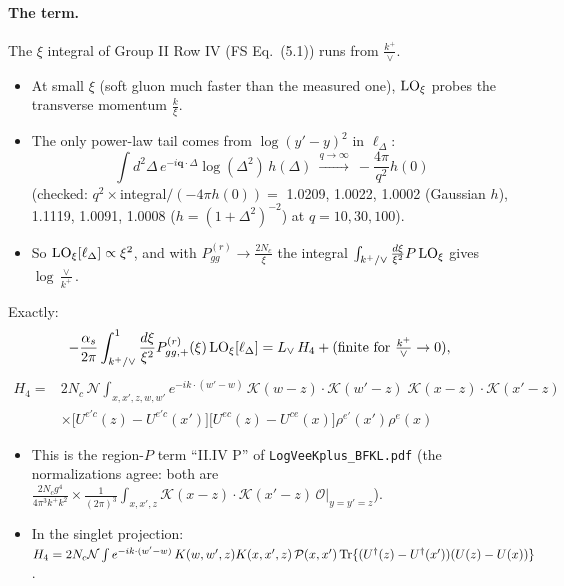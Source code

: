 \documentclass[10pt]{article}
\numberwithin{equation}{section}
\newcommand{\Lv}{L_{\vee}}
\newcommand{\KK}{\mathcal K}
\newcommand{\OO}{\mathcal O}
\newcommand{\NN}{\mathcal N}
\newcommand{\pre}{\frac{1}{(2\pi)^3}}
\newcommand{\phw}{e^{-ik\cdot(w'-w)}}
\begin{document}
\paragraph{The term.} The $\xi$ integral of Group II Row IV (FS Eq.~(5.1)) runs from $\frac{k^+}{\vee}$.
\begin{itemize}
\item At small $\xi$ (soft gluon much faster than the measured one), ${\rm LO}_\xi$ probes the transverse momentum $\frac{k}{\xi}$.
\item The only power-law tail comes from $\log(y'-y)^2$ in $\ell_\Delta$:
\begin{equation}
\int d^2\Delta\,e^{-i\mathbf q\cdot\Delta}\log(\Delta^2)\,h(\Delta)\ \xrightarrow{q\to\infty}\ -\frac{4\pi}{q^2}h(0)
\end{equation}
(checked: $q^2\times$integral$/(-4\pi h(0))=$ 1.0209, 1.0022, 1.0002 (Gaussian $h$), 1.1119, 1.0091, 1.0008 ($h=(1+\Delta^2)^{-2}$) at $q=10,30,100$).
\item So ${\rm LO}_\xi[\ell_\Delta]\propto\xi^2$, and with $P^{(r)}_{gg}\to\frac{2N_c}{\xi}$ the integral $\int_{k^+/\vee}\frac{d\xi}{\xi^2}P\,{\rm LO}_\xi$ gives $\log\frac{\vee}{k^+}$.
\end{itemize}
Exactly:
\begin{equation}
-\frac{\alpha_s}{2\pi}\int_{k^+/\vee}^1\frac{d\xi}{\xi^2}P^{(r)}_{gg,+}(\xi)\,{\rm LO}_\xi[\ell_\Delta]=\Lv\,H_4+(\text{finite for }\tfrac{k^+}{\vee}\to0),
\end{equation}
\begin{equation}
\boxed{\begin{aligned}H_4={}&2N_c\,\NN\int_{x,x',z,w,w'}\phw\,\KK(w-z)\cdot\KK(w'-z)\;\KK(x-z)\cdot\KK(x'-z)\\&\times\big[U^{e'c}(z)-U^{e'c}(x')\big]\big[U^{ec}(z)-U^{ce}(x)\big]\rho^{e'}(x')\rho^e(x)\end{aligned}}
\end{equation}
\begin{itemize}
\item This is the region-$P$ term ``II.IV P'' of \texttt{LogVeeKplus\_BFKL.pdf} (the normalizations agree: both are $\frac{2N_cg^4}{4\pi^3k^+k^2}\times\pre\int_{x,x',z}\KK(x-z)\cdot\KK(x'-z)\,\OO|_{y=y'=z}$).
\item In the singlet projection: $H_4=2N_c\NN\int\phw\,K(w,w',z)K(x,x',z)\,\mathcal P(x,x')\,{\rm Tr}\{(U^\dagger(z)-U^\dagger(x'))(U(z)-U(x))\}$.
\end{itemize}
\end{document}
